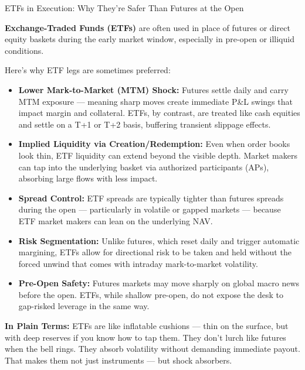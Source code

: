 \begin{TechnicalSidebar}{ETFs in Execution: Why They're Safer Than Futures at the Open}

    \textbf{Exchange-Traded Funds (ETFs)} are often used in place of futures or direct equity baskets during the early market window, especially in pre-open or illiquid conditions.
    
    \medskip
    
    Here’s why ETF legs are sometimes preferred:

    \medskip
    
    \begin{itemize}
      \item \textbf{Lower Mark-to-Market (MTM) Shock:}  
      Futures settle daily and carry MTM exposure — meaning sharp moves create immediate P\&L swings that impact margin and collateral.  
      ETFs, by contrast, are treated like cash equities and settle on a T+1 or T+2 basis, buffering transient slippage effects.
    
      \item \textbf{Implied Liquidity via Creation/Redemption:}  
      Even when order books look thin, ETF liquidity can extend beyond the visible depth. Market makers can tap into the underlying basket via authorized participants (APs), absorbing large flows with less impact.
    
      \item \textbf{Spread Control:}  
      ETF spreads are typically tighter than futures spreads during the open — particularly in volatile or gapped markets — because ETF market makers can lean on the underlying NAV.
    
      \item \textbf{Risk Segmentation:}  
      Unlike futures, which reset daily and trigger automatic margining, ETFs allow for directional risk to be taken and held without the forced unwind that comes with intraday mark-to-market volatility.
    
      \item \textbf{Pre-Open Safety:}  
      Futures markets may move sharply on global macro news before the open. ETFs, while shallow pre-open, do not expose the desk to gap-risked leverage in the same way.
    \end{itemize}
    
    \medskip
    
    \textbf{In Plain Terms:}  
    ETFs are like inflatable cushions — thin on the surface, but with deep reserves if you know how to tap them.  
    They don’t lurch like futures when the bell rings.  
    They absorb volatility without demanding immediate payout.  
    That makes them not just instruments — but shock absorbers.
    
\end{TechnicalSidebar}

